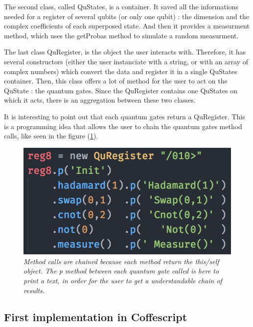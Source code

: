 \documentclass[a4paper,12pt]{report}
\newcommand{\para}[1]{\par{#1}\\}
\begin{document}
\para{
    The second class, called QuStates, is a container. It saved all the informations needed for a register of several qubits (or only one qubit) : the dimension and the complex coefficients of each superposed state. And then it provides a measurment method, which uses the getProbas method to simulate a random measurment.
}

\para{
    The last class QuRegister, is the object the user interacts with. Therefore, it has several constructors (either the user instanciate with a string, or with an array of complex numbers) which convert the data and register it in a single QuStates container. Then, this class offers a lot of method for the user to act on the QuState : the quantum gates. Since the QuRegister contains one QuStates on which it acts, there is an aggregation between these two classes.
}

\para{
    It is interesting to point out that each quantum gates return a QuRegister. This is a programming idea that allows the user to chain the quantum gates method calls, like seen in the figure (\ref{chaining}).
}

\begin{figure}[H]
	\begin{center}
		\includegraphics[scale=0.6]{images/chaining}
	\end{center}
	\caption{\textit{Method calls are chained because each method return the this/self object. The p method between each quantum gate called is here to print a text, in order for the user to get a understandable chain of results.}}
	\label{chaining}
\end{figure}

        \subsection{First implementation in Coffescript}
\end{document}

